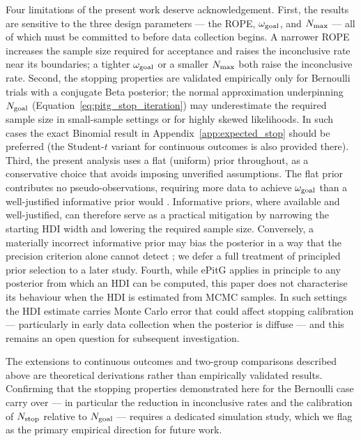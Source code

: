 Four limitations of the present work deserve acknowledgement.
First, the results are sensitive to the three design parameters --- the ROPE,
$\omega_{\rm goal}$, and $N_{\rm max}$ --- all of which must be committed to before
data collection begins.
A narrower ROPE increases the sample size required for acceptance and raises the
inconclusive rate near its boundaries; a tighter $\omega_{\rm goal}$ or a smaller
$N_{\rm max}$ both raise the inconclusive rate.
Second, the stopping properties are validated empirically only for Bernoulli trials
with a conjugate Beta posterior; the normal approximation underpinning
$N_{\rm goal}$ (Equation~\ref{eq:pitg_stop_iteration}) may underestimate the required
sample size in small-sample settings or for highly skewed likelihoods.
In such cases the exact Binomial result in Appendix~\ref{app:expected_stop} should be
preferred (the Student-$t$ variant for continuous outcomes is also provided there).
Third, the present analysis uses a flat (uniform) prior throughout, as a conservative
choice that avoids imposing unverified assumptions.
The flat prior contributes no pseudo-observations, requiring more data to achieve
$\omega_{\rm goal}$ than a well-justified informative prior would \citep{gelman2013bayesian}.
Informative priors, where available and well-justified, can therefore serve as a
practical mitigation by narrowing the starting HDI width and lowering the required
sample size.
Conversely, a materially incorrect informative prior may bias the posterior in a way
that the precision criterion alone cannot detect \citep{gelman2013bayesian};
we defer a full treatment of principled prior selection to a later study.
Fourth, while ePitG applies in principle to any posterior from which an HDI can be
computed, this paper does not characterise its behaviour when the HDI is estimated
from MCMC samples.
In such settings the HDI estimate carries Monte Carlo error that could affect stopping
calibration --- particularly in early data collection when the posterior is diffuse ---
and this remains an open question for subsequent investigation.

The extensions to continuous outcomes and two-group comparisons described above are
theoretical derivations rather than empirically validated results.
Confirming that the stopping properties demonstrated here for the Bernoulli case carry
over --- in particular the reduction in inconclusive rates and the calibration of
$N_{\rm stop}$ relative to $N_{\rm goal}$ --- requires a dedicated simulation study,
which we flag as the primary empirical direction for future work.

